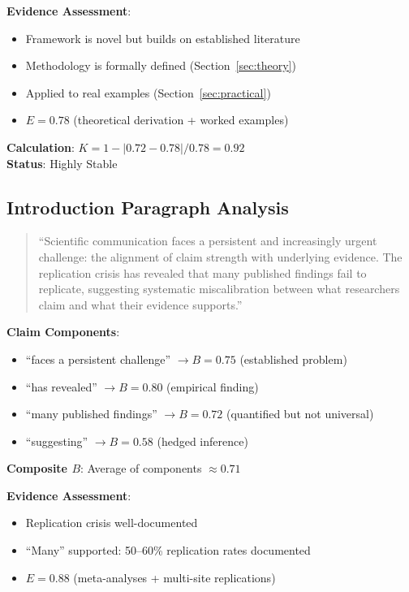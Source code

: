 \documentclass[11pt,a4paper]{article}
\begin{document}
\textbf{Evidence Assessment}:
\begin{itemize}
    \item Framework is novel but builds on established literature
    \item Methodology is formally defined (Section~\ref{sec:theory})
    \item Applied to real examples (Section~\ref{sec:practical})
    \item $E = 0.78$ (theoretical derivation + worked examples)
\end{itemize}

\textbf{Calculation}: $K = 1 - |0.72 - 0.78| / 0.78 = 0.92$ \\
\textbf{Status}: \textcolor{green!60!black}{Highly Stable}

\subsection{Introduction Paragraph Analysis}

\begin{quote}
``Scientific communication faces a persistent and increasingly urgent challenge: the alignment of claim strength with underlying evidence. The replication crisis has revealed that many published findings fail to replicate, suggesting systematic miscalibration between what researchers claim and what their evidence supports.''
\end{quote}

\textbf{Claim Components}:
\begin{itemize}
    \item ``faces a persistent challenge'' $\to B = 0.75$ (established problem)
    \item ``has revealed'' $\to B = 0.80$ (empirical finding)
    \item ``many published findings'' $\to B = 0.72$ (quantified but not universal)
    \item ``suggesting'' $\to B = 0.58$ (hedged inference)
\end{itemize}

\textbf{Composite $B$}: Average of components $\approx 0.71$

\textbf{Evidence Assessment}:
\begin{itemize}
    \item Replication crisis well-documented \citep{OpenScienceCollaboration2015, Camerer2016}
    \item ``Many'' supported: 50--60\% replication rates documented
    \item $E = 0.88$ (meta-analyses + multi-site replications)
\end{itemize}
\end{document}

